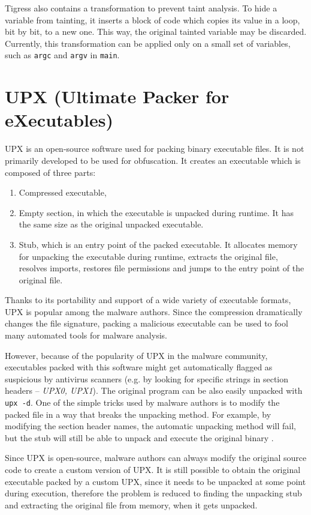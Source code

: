 \documentclass[
  digital, %
  notable,   %
  twoside, %
  nolof,     %
  nolot,     %
]{fithesis3}
\theoremstyle{definition}
\begin{document}
Tigress also contains a transformation to prevent taint analysis. To hide a variable from tainting, it inserts a block of code which copies its value in a loop, bit by bit, to a new one. This way, the original tainted variable may be discarded. Currently, this transformation can be applied only on a small set of variables, such as \texttt{argc} and \texttt{argv} in \texttt{main}.

\section{UPX (Ultimate Packer for eXecutables)}
UPX is an open-source software used for packing binary executable files. It is not primarily developed to be used for obfuscation. It creates an executable which is composed of three parts:
\begin{enumerate}
    \item Compressed executable,
    \item Empty section, in which the executable is unpacked during runtime. It has the same size as the original unpacked executable.
    \item Stub, which is an entry point of the packed executable. It allocates memory for unpacking the executable during runtime, extracts the original file, resolves imports, restores file permissions and jumps to the entry point of the original file.
\end{enumerate}

Thanks to its portability and support of a wide variety of executable formats, UPX is popular among the malware authors. Since the compression dramatically changes the file signature, packing a malicious executable can be used to fool many automated tools for malware analysis. 

However, because of the popularity of UPX in the malware community, executables packed with this software might get automatically flagged as suspicious by antivirus scanners (e.g. by looking for specific strings in section headers -- \textit{UPX0, UPX1}). The original program can be also easily unpacked with \texttt{upx -d}. One of the simple tricks used by malware authors is to modify the packed file in a way that breaks the unpacking method. For example, by modifying the section header names, the automatic unpacking method will fail, but the stub will still be able to unpack and execute the original binary \cite{simple_upx}.

Since UPX is open-source, malware authors can always modify the original source code to create a custom version of UPX. It is still possible to obtain the original executable packed by a custom UPX, since it needs to be unpacked at some point during execution, therefore the problem is reduced to finding the unpacking stub and extracting the original file from memory, when it gets unpacked. 
\end{document}
